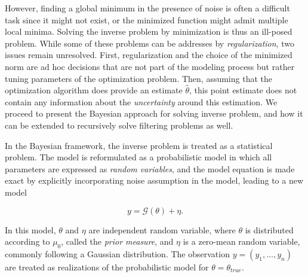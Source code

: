 However, finding a global minimum in the presence of noise is often a difficult task since it might not exist, or the minimized function might admit multiple local minima. Solving the inverse problem by minimization is thus an ill-posed problem. While some of these problems can be addresses by \textit{regularization}, two issues remain unresolved. First, regularization and the choice of the minimized norm are ad hoc decisions that are not part of the modeling process but rather tuning parameters of the optimization problem. Then, assuming that the optimization algorithm does provide an estimate $\hat\theta$, this point estimate does not contain any information about the \textit{uncertainty} around this estimation. We proceed to present the Bayesian approach for solving inverse problem, and how it can be extended to recursively solve filtering problems as well.

In the Bayesian framework, the inverse problem is treated as a statistical problem. The model is reformulated as a probabilistic model in which all parameters are expressed as \textit{random variables}, and the model equation is made exact by explicitly incorporating noise assumption in the model, leading to a new model

\begin{equation}
  y = \mathcal{G}(\theta) + \eta.
\end{equation}

In this model, $\theta$ and $\eta$ are independent random variable, where $\theta$ is distributed according to $\mu_0$, called the \textit{prior measure}, and $\eta$ is a zero-mean random variable, commonly following a Gaussian distribution. The observation $y = (y_1, \ldots, y_n)$ are treated as realizations of the probabilistic model for $\theta = \theta_{true}$. 



































